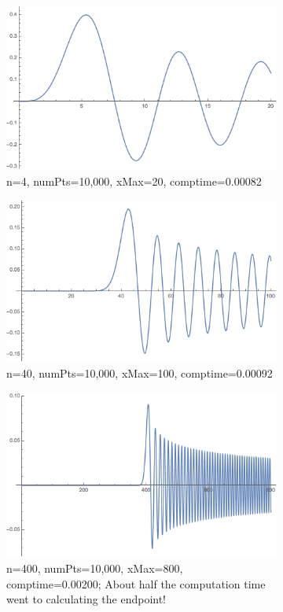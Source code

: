 \documentclass[onecolumn, groupedaddress, 10pt]{revtex4-1}
\begin{document}
\begin{figure}[t]
	\centering
	\begin{subfigure}{.5\textwidth}
  		\centering
  		\includegraphics[width=.9\linewidth]{BesselJ4.png}
  		\caption{n=4, numPts=10,000, xMax=20, comptime=0.00082}
	\end{subfigure}%
	\begin{subfigure}{.5\textwidth}
  		\centering
  		\includegraphics[width=.9\linewidth]{BesselJ40.png}
  		\caption{n=40, numPts=10,000, xMax=100, comptime=0.00092}
	\end{subfigure}
	\begin{subfigure}{.5\textwidth}
  		\centering
  		\includegraphics[width=.9\linewidth]{BesselJ400.png}
  		\caption{n=400, numPts=10,000, xMax=800, comptime=0.00200;  About half the computation time went to calculating the endpoint!}
	\end{subfigure}
	\caption{\label{fig:selectBesselFunctions}}
\end{figure}
\end{document}
